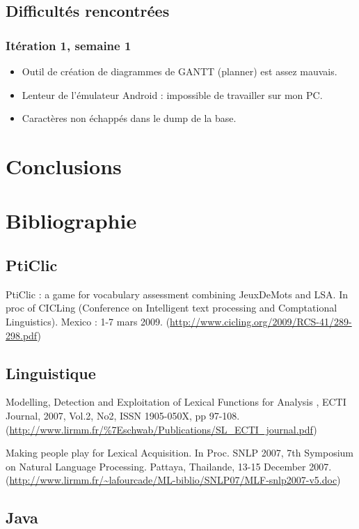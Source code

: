\documentclass[a4paper,11pt,french]{article}
\begin{document}
\subsection{Difficultés rencontrées}
\subsubsection{Itération 1, semaine 1}
\begin{itemize}
\item Outil de création de diagrammes de GANTT (planner) est assez mauvais.
\item Lenteur de l'émulateur Android : impossible de travailler sur mon PC.%
\item Caractères non échappés dans le dump de la base.%
\end{itemize}


\section{Conclusions}

\newpage


\section{Bibliographie}
\subsection{PtiClic}

PtiClic : a game for vocabulary assessment combining JeuxDeMots and LSA. In proc of CICLing (Conference on Intelligent text processing and Comptational Linguistics). Mexico : 1-7 mars 2009. (\url{http://www.cicling.org/2009/RCS-41/289-298.pdf})


\subsection{Linguistique}

Modelling, Detection and Exploitation of Lexical Functions for Analysis , ECTI Journal, 2007, Vol.2, No2, ISSN 1905-050X, pp 97-108. (\url{http://www.lirmm.fr/\%7Eschwab/Publications/SL_ECTI_journal.pdf})

Making people play for Lexical Acquisition. In Proc. SNLP 2007, 7th Symposium on Natural Language Processing. Pattaya, Thailande, 13-15 December 2007. (\url{http://www.lirmm.fr/~lafourcade/ML-biblio/SNLP07/MLF-snlp2007-v5.doc})


\subsection{Java}
\end{document}
